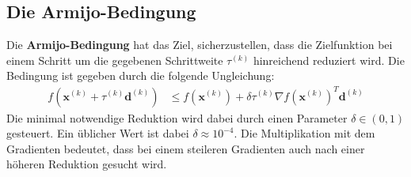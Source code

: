 \documentclass{report}
\newcommand{\tbf}{\textbf}
\newcommand{\xk}{\bm{x}^{(k)}}
\newcommand{\dk}{\bm{d}^{(k)}}
\newcommand{\tauk}{\tau^{(k)}}
\begin{document}
\subsection{Die Armijo-Bedingung}
Die \tbf{Armijo-Bedingung} hat das Ziel, sicherzustellen, dass die Zielfunktion bei einem Schritt um die gegebenen Schrittweite $\tauk$ hinreichend reduziert wird. Die Bedingung ist gegeben durch die folgende Ungleichung:
\begin{align*}
f(\xk + \tauk \dk) &\leq f(\xk) + \delta \tauk \nabla f(\xk)^T \dk
\end{align*}
Die minimal notwendige Reduktion wird dabei durch einen Parameter $\delta \in (0,1)$ gesteuert. Ein üblicher Wert ist dabei $\delta \approx 10^{-4}$. Die Multiplikation mit dem Gradienten bedeutet, dass bei einem steileren Gradienten auch nach einer höheren Reduktion gesucht wird.
%
\end{document}
